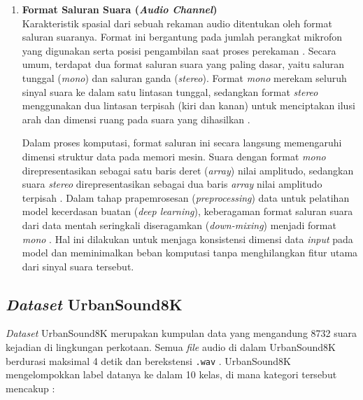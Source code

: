 \begin{enumerate}
    \item \textbf{Format Saluran Suara (\textit{Audio Channel})} \\
    Karakteristik spasial dari sebuah rekaman audio ditentukan oleh format saluran suaranya.
		Format ini bergantung pada jumlah perangkat mikrofon yang digunakan serta posisi pengambilan saat proses perekaman \cite{li2014fundamentals}.
		Secara umum, terdapat dua format saluran suara yang paling dasar, yaitu saluran tunggal (\textit{mono}) dan saluran ganda (\textit{stereo}).
		Format \textit{mono} merekam seluruh sinyal suara ke dalam satu lintasan tunggal, sedangkan format \textit{stereo} menggunakan dua lintasan terpisah (kiri dan kanan) untuk menciptakan ilusi arah dan dimensi ruang pada suara yang dihasilkan \cite{li2014fundamentals}.
		
		Dalam proses komputasi, format saluran ini secara langsung memengaruhi dimensi struktur data pada memori mesin.
		Suara dengan format \textit{mono} direpresentasikan sebagai satu baris deret (\textit{array}) nilai amplitudo, sedangkan suara \textit{stereo} direpresentasikan sebagai dua baris \textit{array} nilai amplitudo terpisah \cite{li2014fundamentals}.
		Dalam tahap prapemrosesan (\textit{preprocessing}) data untuk pelatihan model kecerdasan buatan (\textit{deep learning}), keberagaman format saluran suara dari data mentah seringkali diseragamkan (\textit{down-mixing}) menjadi format \textit{mono} \cite{kong2020panns}. 
		Hal ini dilakukan untuk menjaga konsistensi dimensi data \textit{input} pada model dan meminimalkan beban komputasi tanpa menghilangkan fitur utama dari sinyal suara tersebut. \par
\end{enumerate}

\subsection{\textit{Dataset} UrbanSound8K} \label{II.Teori3}
\textit{Dataset} UrbanSound8K merupakan kumpulan data yang mengandung 8732 suara kejadian di lingkungan perkotaan.
Semua \textit{file} audio di dalam UrbanSound8K berdurasi maksimal 4 detik dan berekstensi \texttt{.wav} \cite{salamon2014dataset}. 
UrbanSound8K mengelompokkan label datanya ke dalam 10 kelas, di mana kategori tersebut mencakup :

